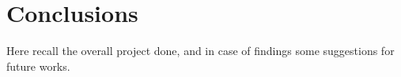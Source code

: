 \section{Conclusions}

Here recall the overall project done, and in case of findings some suggestions for future works.\\